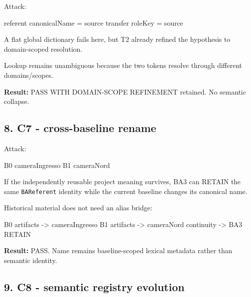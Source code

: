 \documentclass[
  10pt,
  a4paper,
]{article}
\newenvironment{Shaded}{}{}
\newcommand{\NormalTok}[1]{#1}
\begin{document}
Attack:

\begin{Shaded}
\begin{Highlighting}[]
\NormalTok{referent canonicalName = source}
\NormalTok{transfer roleKey        = source}
\end{Highlighting}
\end{Shaded}

A flat global dictionary fails here, but T2 already refined the
hypothesis to domain-scoped resolution.

Lookup remains unambiguous because the two tokens resolve through
different domains/scopes.

\textbf{Result:} PASS WITH DOMAIN-SCOPE REFINEMENT retained. No semantic
collapse.

\subsection{8. C7 - cross-baseline
rename}\label{8-c7---cross-baseline-rename}

Attack:

\begin{Shaded}
\begin{Highlighting}[]
\NormalTok{B0  cameraIngresso}
\NormalTok{B1  cameraNord}
\end{Highlighting}
\end{Shaded}

If the independently reusable project meaning survives, BA3 can RETAIN
the same \texttt{BAReferent} identity while the current baseline changes
its canonical name.

Historical material does not need an alias bridge:

\begin{Shaded}
\begin{Highlighting}[]
\NormalTok{B0 artifacts {-}\textgreater{} cameraIngresso}
\NormalTok{B1 artifacts {-}\textgreater{} cameraNord}
\NormalTok{continuity   {-}\textgreater{} BA3 RETAIN}
\end{Highlighting}
\end{Shaded}

\textbf{Result:} PASS. Name remains baseline-scoped lexical metadata
rather than semantic identity.

\subsection{9. C8 - semantic registry
evolution}\label{9-c8---semantic-registry-evolution}
\end{document}
